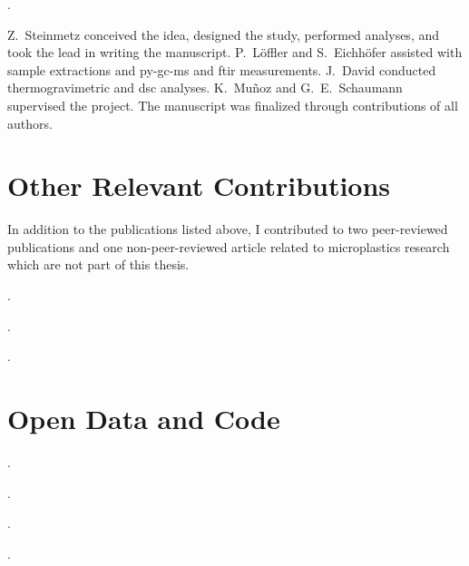 \vspace{0.5\baselineskip}
\noindent{}.

\begin{description}
	\setlength\itemsep{0em}
	\item[Author contributions:] Z.~Steinmetz conceived the idea, designed the study, performed analyses, and took the lead in writing the manuscript. P.~Löffler and S.~Eichhöfer assisted with sample extractions and \ac{py-gc-ms} and \ac{ftir} measurements. J.~David conducted thermogravimetric and \ac{dsc} analyses. K.~Muñoz and G.~E.~Schaumann supervised the project. The manuscript was finalized through contributions of all authors.
\end{description}

\section*{Other Relevant Contributions}

In addition to the publications listed above, I contributed to two peer-reviewed publications and one non-peer-reviewed article related to microplastics research which are not part of this thesis.

\vspace{0.5\baselineskip}
\noindent{}.

\vspace{0.5\baselineskip}
\noindent{}.

\vspace{0.5\baselineskip}
\noindent{}.

\section*{Open Data and Code}

\noindent{}.

\vspace{0.5\baselineskip}
\noindent{}.

\vspace{0.5\baselineskip}
\noindent{}.

\vspace{0.5\baselineskip}
\noindent{}.
